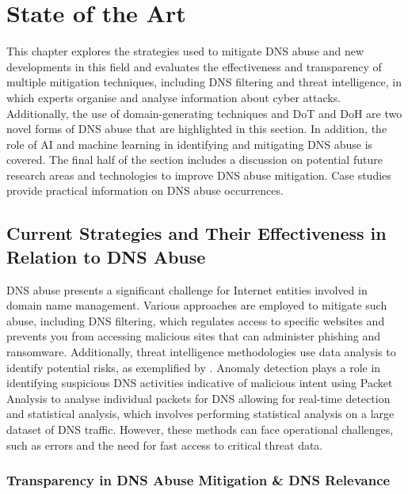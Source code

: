 \chapter{State of the Art}

This chapter explores the strategies used to mitigate DNS abuse and new developments in this field and evaluates the effectiveness and transparency of multiple mitigation techniques, including DNS filtering and threat intelligence, in which experts organise and analyse information about cyber attacks. Additionally, the use of domain-generating techniques and DoT and DoH are two novel forms of DNS abuse that are highlighted in this section. In addition, the role of AI and machine learning in identifying and mitigating DNS abuse is covered. The final half of the section includes a discussion on potential future research areas and technologies to improve DNS abuse mitigation. Case studies provide practical information on DNS abuse occurrences. 


\section{Current Strategies and Their Effectiveness in Relation to DNS Abuse}


DNS abuse presents a significant challenge for Internet entities involved in domain name management. Various approaches are employed to mitigate such abuse, including DNS filtering, which regulates access to specific websites and prevents you from accessing malicious sites that can administer phishing and ransomware. Additionally, threat intelligence methodologies use data analysis to identify potential risks, as exemplified by \cite{schmid2021thirty}. Anomaly detection plays a role in identifying suspicious DNS activities indicative of malicious intent using Packet Analysis to analyse individual packets for DNS allowing for real-time detection and statistical analysis, which involves performing statistical analysis on a large dataset of DNS traffic. However, these methods can face operational challenges, such as errors and the need for fast access to critical threat data. 

\subsection{Transparency in DNS Abuse Mitigation \& DNS Relevance}

